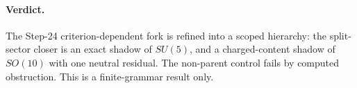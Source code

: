 \paragraph{Verdict.}
The Step-24 criterion-dependent fork is refined into a scoped hierarchy: the split-sector closer is an exact shadow of \(SU(5)\), and a charged-content shadow of \(SO(10)\) with one neutral residual. The non-parent control fails by computed obstruction. This is a finite-grammar result only.
